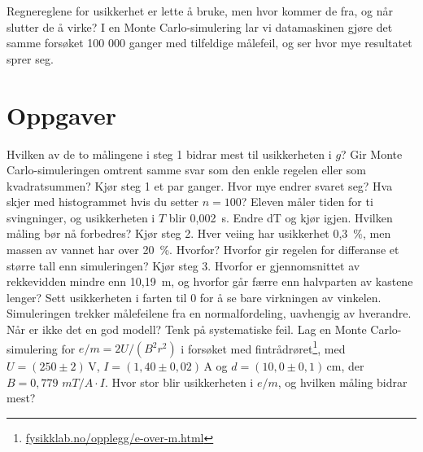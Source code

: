 \documentclass[11pt]{article}
\begin{document}

Regnereglene for usikkerhet er lette å bruke, men hvor kommer de fra, og når slutter de å virke? I en Monte Carlo-simulering lar vi datamaskinen gjøre det samme forsøket 100 000 ganger med tilfeldige målefeil, og ser hvor mye resultatet sprer seg.

\section*{Oppgaver}

\begin{oppgaveliste}
\oppgave {}Hvilken av de to målingene i steg 1 bidrar mest til usikkerheten i $g$? Gir Monte Carlo-simuleringen omtrent samme svar som den enkle regelen eller som kvadratsummen?
\svar
\oppgave {}Kjør steg 1 et par ganger. Hvor mye endrer svaret seg? Hva skjer med histogrammet hvis du setter $n = 100$?
\svar
\oppgave {}Eleven måler tiden for ti svingninger, og usikkerheten i $T$ blir 0,002~s. Endre dT og kjør igjen. Hvilken måling bør nå forbedres?
\svar
\oppgave {}Kjør steg 2. Hver veiing har usikkerhet 0,3~\%, men massen av vannet har over 20~\%. Hvorfor? Hvorfor gir regelen for differanse et større tall enn simuleringen?
\svar
\oppgave {}Kjør steg 3. Hvorfor er gjennomsnittet av rekkevidden mindre enn 10,19~m, og hvorfor går færre enn halvparten av kastene lenger? Sett usikkerheten i farten til 0 for å se bare virkningen av vinkelen.
\svar
\oppgave {}Simuleringen trekker målefeilene fra en normalfordeling, uavhengig av hverandre. Når er ikke det en god modell? Tenk på systematiske feil.
\svar
\oppgave {}Lag en Monte Carlo-simulering for $e/m = 2U/(B^{2}r^{2})$ i forsøket med fintrådrøret\footnote{\url{fysikklab.no/opplegg/e-over-m.html}}, med $U = (250 \pm  2)\,\mathrm{V}$, $I = (1{,}40 \pm  0{,}02)\,\mathrm{A}$ og $d = (10{,}0 \pm  0{,}1)\,\mathrm{cm}$, der $B = 0{,}779$ $mT/A \cdot I$. Hvor stor blir usikkerheten i $e/m$, og hvilken måling bidrar mest?
\svar
\end{oppgaveliste}
\end{document}
